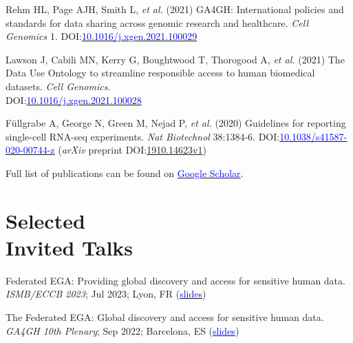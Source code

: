 \documentclass[margin,line]{res}
\begin{document}
\begin{resume}
Rehm HL, Page AJH, Smith L, {\em et al.} (2021) GA4GH: International policies and standards for data sharing across genomic research and healthcare. {\em Cell Genomics} 1. DOI:\href{https://doi.org/10.1016/j.xgen.2021.100029}{\textcolor{blue}{10.1016/j.xgen.2021.100029}}

Lawson J, Cabili MN, Kerry G, Boughtwood T, Thorogood A, {\em et al.} (2021) The Data Use Ontology to streamline responsible access to human biomedical datasets. {\em Cell Genomics}.\\ DOI:\href{https://doi.org/10.1016/j.xgen.2021.100028}{\textcolor{blue}{10.1016/j.xgen.2021.100028}}

Füllgrabe A, George N, Green M, Nejad P, {\em et al.} (2020) Guidelines for reporting single-cell RNA-seq experiments. {\em Nat Biotechnol} 38:1384-6. DOI:\href{https://www.nature.com/articles/s41587-020-00744-z}{\textcolor{blue}{10.1038/s41587-020-00744-z}} ({\em arXiv} preprint DOI:\href{https://arxiv.org/abs/1910.14623}{{1910.14623v1}})


\Rightarrow  Full list of publications can be found on \href{https://scholar.google.com/citations?user=2LCcJA0AAAAJ&hl=en}{\textcolor{blue}{Google Scholar}}.

\section{\sc Selected\\ Invited Talks}

Federated EGA: Providing global discovery and access for sensitive human data. {\em ISMB/ECCB 2023}; Jul 2023; Lyon, FR (\href{https://docs.google.com/presentation/d/1P9KMd-NAjbz1f9fgO9FVuyYTVAoYZoJAqL0wvnVNrt4/edit?usp=sharing}{\textcolor{blue}{slides}})

The Federated EGA: Global discovery and access for sensitive human data. {\em GA4GH 10th Plenary}; Sep 2022; Barcelona, ES (\href{https://docs.google.com/presentation/d/17wJu5ntPdT1Uj3kSOd_ROHY0DK7IzRwRq6Lgyvso2aw/edit?usp=sharing}{\textcolor{blue}{slides}})



\end{resume}
\end{document}
